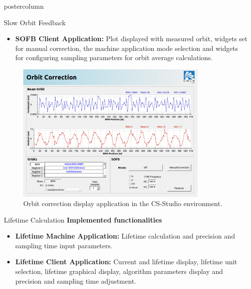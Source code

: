 \documentclass{beamer}
\begin{document}
\begin{frame}
\begin{columns}
\begin{column}{.55\textwidth}
\begin{beamercolorbox}[center]{postercolumn}
\begin{minipage}{.98\textwidth}
{\begin{myblock}{Slow Orbit Feedback}
\begin{itemize}
							\item \textbf{SOFB Client Application:} Plot displayed with measured orbit, widgets set for manual correction, the machine application mode selection and widgets for configuring sampling parameters for orbit average calculations.
						\end{itemize}
						\vspace{0.5cm}
						\begin{figure}
							\centering
							\includegraphics[width=0.85\textwidth]{../WEPOPRPO22f3.png}
							\caption{Orbit correction display application in the CS-Studio environment.}
						\end{figure}
					\end{myblock}\vfill
					\begin{myblock}{Lifetime Calculation}
						\textbf{Implemented functionalities}
						\begin{itemize}
							\item \textbf{Lifetime Machine Application:} Lifetime calculation and precision and sampling time input parameters.
							\item \textbf{Lifetime Client Application:} Current and lifetime display, lifetime unit selection, lifetime graphical display, algorithm parameters display and precision and sampling time adjustment.
						\end{itemize}
						\vspace{0.5cm}
						\begin{figure}
							\centering

\end{figure}
\end{myblock}}
\end{minipage}
\end{beamercolorbox}
\end{column}
\end{columns}
\end{frame}
\end{document}
